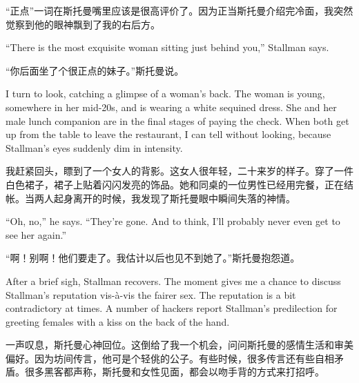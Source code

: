 \ifdefined\chs
``正点''一词在斯托曼嘴里应该是很高评价了。因为正当斯托曼介绍完冷面，我突然觉察到他的眼神飘到了我的右后方。
\fi

\ifdefined\eng
``There is the most exquisite woman sitting just behind you,'' Stallman says.
\fi

\ifdefined\chs
``你后面坐了个很正点的妹子。''斯托曼说。
\fi

\ifdefined\eng
I turn to look, catching a glimpse of a woman's back. The woman is young, somewhere in her mid-20s, and is wearing a white sequined dress. She and her male lunch companion are in the final stages of paying the check. When both get up from the table to leave the restaurant, I can tell without looking, because Stallman's eyes suddenly dim in intensity.
\fi

\ifdefined\chs
我赶紧回头，瞟到了一个女人的背影。这女人很年轻，二十来岁的样子。穿了一件白色裙子，裙子上贴着闪闪发亮的饰品。她和同桌的一位男性已经用完餐，正在结帐。当两人起身离开的时候，我发现了斯托曼眼中瞬间失落的神情。
\fi

\ifdefined\eng
``Oh, no,'' he says. ``They're gone. And to think, I'll probably never even get to see her again.''
\fi

\ifdefined\chs
``啊！别啊！他们要走了。我估计以后也见不到她了。''斯托曼抱怨道。
\fi

\ifdefined\eng
After a brief sigh, Stallman recovers. The moment gives me a chance to discuss Stallman's reputation vis-à-vis the fairer sex. The reputation is a bit contradictory at times. A number of hackers report Stallman's predilection for greeting females with a kiss on the back of the hand. 
\fi

\ifdefined\chs
一声叹息，斯托曼心神回位。这倒给了我一个机会，问问斯托曼的感情生活和审美偏好。因为坊间传言，他可是个轻佻的公子。有些时候，很多传言还有些自相矛盾。很多黑客都声称，斯托曼和女性见面，都会以吻手背的方式来打招呼。
\fi

